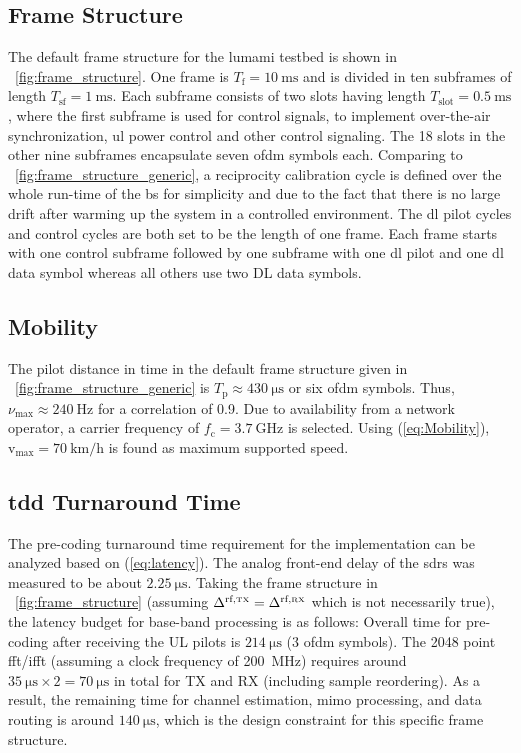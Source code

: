 \documentclass[journal]{IEEEtran}
\begin{document}
\subsection{Frame Structure}
The default frame structure for the \gls{lumami} testbed is shown in \figurename~\ref{fig:frame_structure}.
One frame is $T_\text{f}=\SI{10}{\milli\second}$ and is divided in ten subframes of length $T_\text{sf}=\SI{1}{\milli\second}$. 
Each subframe consists of two slots having length $T_\text{slot}=\SI{0.5}{\milli\second}$, where the first subframe is used for control signals, \eg to implement over-the-air synchronization, \gls{ul} power control and other control signaling.
The 18 slots in the other nine subframes encapsulate seven \gls{ofdm} symbols each.
%
%
%
%
%
%
%
%
Comparing to \figurename~\ref{fig:frame_structure_generic}, a reciprocity calibration cycle is defined over the whole run-time of the \gls{bs} for simplicity and due to the fact that there is no large drift after warming up the system in a controlled environment\cite{Vieira2014a}.
The \gls{dl} pilot cycles and control cycles are both set to be the length of one frame.
%
Each frame starts with one control subframe followed by one subframe with one \gls{dl} pilot and one \gls{dl} data symbol whereas all others use two DL data symbols.
%


\subsection{Mobility}
The pilot distance in time in the default frame structure given in \figurename~\ref{fig:frame_structure_generic} is $T_\text{p}\approx \SI{430}{\micro\second}$ or six \gls{ofdm} symbols.
Thus, $\nu_\text{max}\approx\SI{240}{\hertz}$ for a correlation of 0.9.
%
%
%
Due to availability from a network operator, a carrier frequency of $f_\text{c}=\SI{3.7}{\giga\hertz}$ is selected. 
%
Using (\ref{eq:Mobility}), $\text{v}_\text{max}=\SI{70}{\kilo\meter\per\hour}$ is found as maximum supported speed.

\subsection{\gls{tdd} Turnaround Time}
The pre-coding turnaround time requirement for the implementation can be analyzed based on (\ref{eq:latency}).
The analog front-end delay of the \glspl{sdr} was measured to be about $\SI{2.25}{\micro\second}$.
Taking the frame structure in \figurename~\ref{fig:frame_structure} (assuming $\Delta^\text{rf,\tiny{TX}}=\Delta^\text{rf,\tiny{RX}}$ which is not necessarily true), the latency budget for base-band processing is as follows:
Overall time for pre-coding after receiving the UL pilots is $\SI{214}{\micro\second}$ ($3$ \gls{ofdm} symbols).
The 2048 point \gls{fft}/\gls{ifft} (assuming a clock frequency of \SI{200}{\mega\hertz}) requires around $\SI{35}{\micro\second}\times 2 = \SI{70}{\micro\second}$ in total for TX and RX (including sample reordering). 
As a result, the remaining time for channel estimation, \gls{mimo} processing, and data routing is around $\SI{140}{\micro\second}$, which is the design constraint for this specific frame structure.
%
\end{document}
